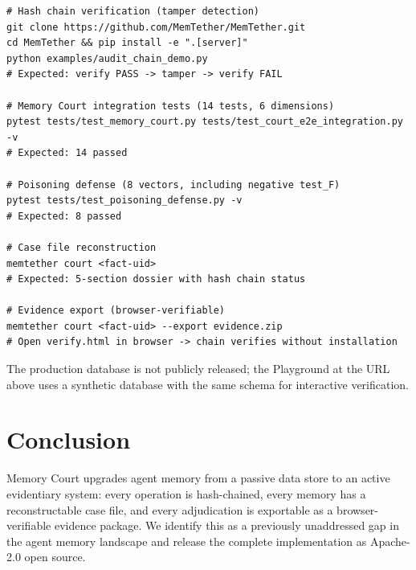 \documentclass{article}
\begin{document}
\begin{verbatim}
# Hash chain verification (tamper detection)
git clone https://github.com/MemTether/MemTether.git
cd MemTether && pip install -e ".[server]"
python examples/audit_chain_demo.py
# Expected: verify PASS -> tamper -> verify FAIL

# Memory Court integration tests (14 tests, 6 dimensions)
pytest tests/test_memory_court.py tests/test_court_e2e_integration.py -v
# Expected: 14 passed

# Poisoning defense (8 vectors, including negative test_F)
pytest tests/test_poisoning_defense.py -v
# Expected: 8 passed

# Case file reconstruction
memtether court <fact-uid>
# Expected: 5-section dossier with hash chain status

# Evidence export (browser-verifiable)
memtether court <fact-uid> --export evidence.zip
# Open verify.html in browser -> chain verifies without installation
\end{verbatim}

The production database is not publicly released; the Playground at the URL above uses a synthetic database with the same schema for interactive verification.
\section{Conclusion}

Memory Court upgrades agent memory from a passive data store to an active evidentiary system: every operation is hash-chained, every memory has a reconstructable case file, and every adjudication is exportable as a browser-verifiable evidence package. We identify this as a previously unaddressed gap in the agent memory landscape and release the complete implementation as Apache-2.0 open source.
\end{document}
